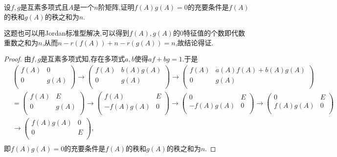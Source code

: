 \documentclass[../../main.tex]{subfiles}%
\begin{document}
\begin{example}
设\( f,g \)是互素多项式且\( A \)是一个\( n \)阶矩阵,证明\( f(A)g(A)=0 \)的充要条件是\( f(A) \)的秩和\( g(A) \)的秩之和为\( n \).
\end{example}
\begin{note}
这题也可以用Jordan标准型解决,可以得到$f(A),g(A)$的0特征值的个数即代数重数之和为$n$,从而$n-r(f(A))+n-r(g(A))=n$,故结论得证.
\end{note}
\begin{proof}
由\( f,g \)是互素多项式知,存在多项式\( a,b \)使得\( af + bg = 1 \).于是
\begin{align*}
&\left( \begin{matrix}
f(A)&		0\\
0&		g(A)\\
\end{matrix} \right) \rightarrow \left( \begin{matrix}
f(A)&		b(A)g(A)\\
0&		g(A)\\
\end{matrix} \right) \rightarrow \left( \begin{matrix}
f(A)&		a(A)f(A)+b(A)g(A)\\
0&		g(A)\\
\end{matrix} \right)\\
&=\left( \begin{matrix}
f(A)&		E\\
0&		g(A)\\
\end{matrix} \right) \rightarrow \left( \begin{matrix}
f(A)&		E\\
-f(A)g(A)&		0\\
\end{matrix} \right) \rightarrow \left( \begin{matrix}
0&		E\\
-f(A)g(A)&		0\\
\end{matrix} \right) \rightarrow \left( \begin{matrix}
0&		E\\
f(A)g(A)&		0\\
\end{matrix} \right)\\
&\rightarrow \left( \begin{matrix}
f(A)g(A)&		0\\
0&		E\\
\end{matrix} \right) ,\\
\end{align*}
即\( f(A)g(A)=0 \)的充要条件是\( f(A) \)的秩和\( g(A) \)的秩之和为\( n \).
\end{proof}
\end{document}
